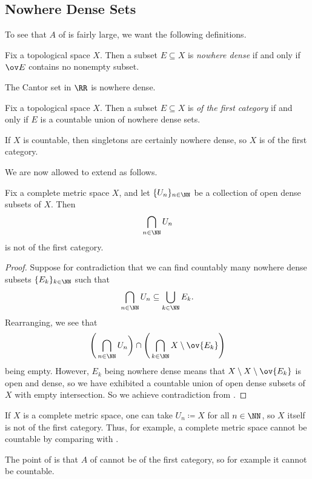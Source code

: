 \documentclass[../notes.tex]{subfiles}
\begin{document}
\subsection{Nowhere Dense Sets}
To see that $A$ of  is fairly large, we want the following definitions.
\begin{definition}
	Fix a topological space $X$. Then a subset $E\subseteq X$ is \textit{nowhere dense} if and only if $\ov E$ contains no nonempty subset.
\end{definition}
\begin{example}
	The Cantor set in $\RR$ is nowhere dense.
\end{example}
\begin{definition}[category]
	Fix a topological space $X$. Then a subset $E\subseteq X$ is \textit{of the first category} if and only if $E$ is a countable union of nowhere dense sets.
\end{definition}
\begin{example} \label{ex:countable-first-cat}
	If $X$ is countable, then singletons are certainly nowhere dense, so $X$ is of the first category.
\end{example}
We are now allowed to extend  as follows.
\begin{theorem}[Baire] \label{thm:baire-2}
	Fix a complete metric space $X$, and let $\{U_n\}_{n\in\NN}$ be a collection of open dense subsets of $X$. Then
	\[\bigcap_{n\in\NN}U_n\]
	is not of the first category.
\end{theorem}
\begin{proof}
	Suppose for contradiction that we can find countably many nowhere dense subsets $\{E_k\}_{k\in\NN}$ such that
	\[\bigcap_{n\in\NN}U_n\subseteq\bigcup_{k\in\NN}E_k.\]
	Rearranging, we see that
	\[\Bigg(\bigcap_{n\in\NN}U_n\bigg)\cap\Bigg(\bigcap_{k\in\NN}X\setminus\ov{E_k}\Bigg)\]
	being empty. However, $E_k$ being nowhere dense means that $X\setminus X\setminus\ov{E_k}$ is open and dense, so we have exhibited a countable union of open dense subsets of $X$ with empty intersection. So we achieve contradiction from .
\end{proof}
\begin{example}
	If $X$ is a complete metric space, one can take $U_n\coloneqq X$ for all $n\in\NN$, so $X$ itself is not of the first category. Thus, for example, a complete metric space cannot be countable by comparing with .
\end{example}
The point of  is that $A$ of  cannot be of the first category, so for example it cannot be countable.
\end{document}
